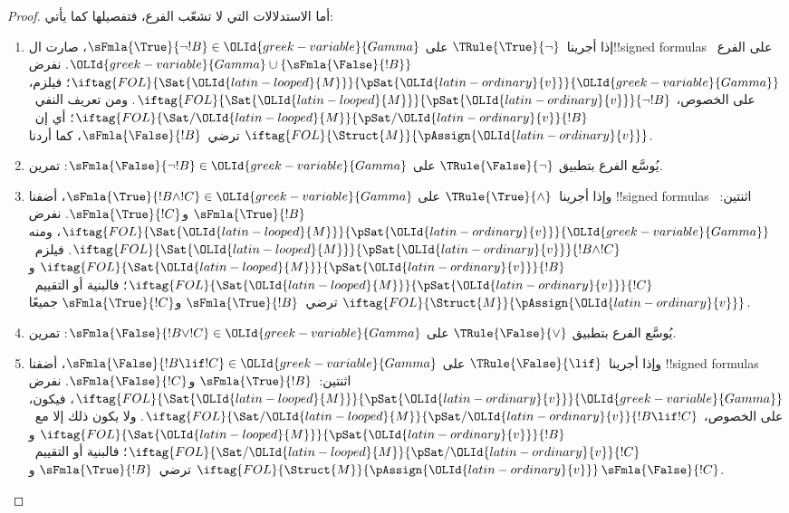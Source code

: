 \documentclass[../../../include/open-logic-section]{subfiles}
\begin{document}
\begin{proof}
أما الاستدلالات التي لا تشعّب الفرع، فتفصيلها كما يأتي:
\begin{enumerate}
\item إذا أجرينا~$\TRule{\True}{\lnot}$ على
  $\sFmla{\True}{\lnot !B} \in \OLId{greek-variable}{Gamma}$، صارت
  ال!!{signed formula}s على الفرع~$\OLId{greek-variable}{Gamma} \cup
  \{\sFmla{\False}{!B}\}$. نفرض
  $\iftag{FOL}{\Sat{\OLId{latin-looped}{M}}}{\pSat{\OLId{latin-ordinary}{v}}}{\OLId{greek-variable}{Gamma}}$؛ فيلزم، على الخصوص،
  $\iftag{FOL}{\Sat{\OLId{latin-looped}{M}}}{\pSat{\OLId{latin-ordinary}{v}}}{\lnot !B}$.
  ومن تعريف النفي~$\iftag{FOL}{\Sat/{\OLId{latin-looped}{M}}}{\pSat/{\OLId{latin-ordinary}{v}}}{!B}$؛
  أي إن~$\iftag{FOL}{\Struct{M}}{\pAssign{\OLId{latin-ordinary}{v}}}$
  ترضي~$\sFmla{\False}{!B}$، كما أردنا.
\item يُوسَّع الفرع بتطبيق $\TRule{\False}{\lnot}$ على
  $\sFmla{\False}{\lnot !B} \in \OLId{greek-variable}{Gamma}$: تمرين.
\item وإذا أجرينا~$\TRule{\True}{\land}$ على
  $\sFmla{\True}{!B \land !C} \in \OLId{greek-variable}{Gamma}$،
  أضفنا !!{signed formula}s اثنتين:~$\sFmla{\True}{!B}$
  و$\sFmla{\True}{!C}$. نفرض
  $\iftag{FOL}{\Sat{\OLId{latin-looped}{M}}}{\pSat{\OLId{latin-ordinary}{v}}}{\OLId{greek-variable}{Gamma}}$، ومنه
  $\iftag{FOL}{\Sat{\OLId{latin-looped}{M}}}{\pSat{\OLId{latin-ordinary}{v}}}{!B \land !C}$.
  فيلزم~$\iftag{FOL}{\Sat{\OLId{latin-looped}{M}}}{\pSat{\OLId{latin-ordinary}{v}}}{!B}$ و
  $\iftag{FOL}{\Sat{\OLId{latin-looped}{M}}}{\pSat{\OLId{latin-ordinary}{v}}}{!C}$؛
  فالبنية أو التقييم~$\iftag{FOL}{\Struct{M}}{\pAssign{\OLId{latin-ordinary}{v}}}$
  ترضي~$\sFmla{\True}{!B}$ و$\sFmla{\True}{!C}$ جميعًا.
\item يُوسَّع الفرع بتطبيق $\TRule{\False}{\lor}$ على
  $\sFmla{\False}{!B \lor !C} \in \OLId{greek-variable}{Gamma}$: تمرين.
\item وإذا أجرينا~$\TRule{\False}{\lif}$ على
  $\sFmla{\False}{!B \lif !C} \in \OLId{greek-variable}{Gamma}$،
  أضفنا !!{signed formula}s اثنتين:~$\sFmla{\True}{!B}$
  و$\sFmla{\False}{!C}$. نفرض
  $\iftag{FOL}{\Sat{\OLId{latin-looped}{M}}}{\pSat{\OLId{latin-ordinary}{v}}}{\OLId{greek-variable}{Gamma}}$، فيكون، على الخصوص،
  $\iftag{FOL}{\Sat/{\OLId{latin-looped}{M}}}{\pSat/{\OLId{latin-ordinary}{v}}}{!B \lif !C}$.
  ولا يكون ذلك إلا مع~$\iftag{FOL}{\Sat{\OLId{latin-looped}{M}}}{\pSat{\OLId{latin-ordinary}{v}}}{!B}$
  و$\iftag{FOL}{\Sat/{\OLId{latin-looped}{M}}}{\pSat/{\OLId{latin-ordinary}{v}}}{!C}$؛
  فالبنية أو التقييم~$\iftag{FOL}{\Struct{M}}{\pAssign{\OLId{latin-ordinary}{v}}}$
  ترضي~$\sFmla{\True}{!B}$ و$\sFmla{\False}{!C}$.



\end{enumerate}
\end{proof}
\end{document}
